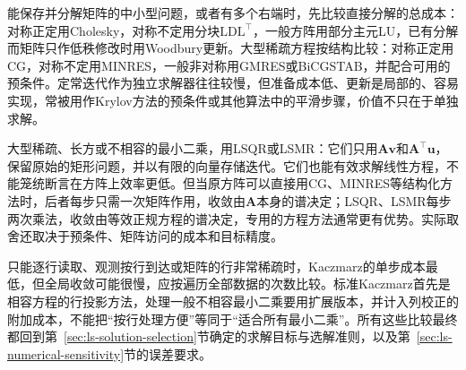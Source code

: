 能保存并分解矩阵的中小型问题，或者有多个右端时，先比较直接分解的总成本：对称正定用Cholesky，对称不定用分块$\mathrm{LDL}^\top$，一般方阵用部分主元LU，已有分解而矩阵只作低秩修改时用Woodbury更新。大型稀疏方程按结构比较：对称正定用CG，对称不定用MINRES，一般非对称用GMRES或BiCGSTAB，并配合可用的预条件。定常迭代作为独立求解器往往较慢，但准备成本低、更新是局部的、容易实现，常被用作Krylov方法的预条件或其他算法中的平滑步骤，价值不只在于单独求解。

大型稀疏、长方或不相容的最小二乘，用LSQR或LSMR：它们只用$\bm A\bm v$和$\bm A^\top\bm u$，保留原始的矩形问题，并以有限的向量存储迭代。它们也能有效求解线性方程，不能笼统断言在方阵上效率更低。但当原方阵可以直接用CG、MINRES等结构化方法时，后者每步只需一次矩阵作用，收敛由$\bm A$本身的谱决定；LSQR、LSMR每步两次乘法，收敛由等效正规方程的谱决定，专用的方程方法通常更有优势。实际取舍还取决于预条件、矩阵访问的成本和目标精度。

只能逐行读取、观测按行到达或矩阵的行非常稀疏时，Kaczmarz的单步成本最低，但全局收敛可能很慢，应按遍历全部数据的次数比较。标准Kaczmarz首先是相容方程的行投影方法，处理一般不相容最小二乘要用扩展版本，并计入列校正的附加成本，不能把“按行处理方便”等同于“适合所有最小二乘”。所有这些比较最终都回到第~\ref{sec:ls-solution-selection}节确定的求解目标与选解准则，以及第~\ref{sec:ls-numerical-sensitivity}节的误差要求。
